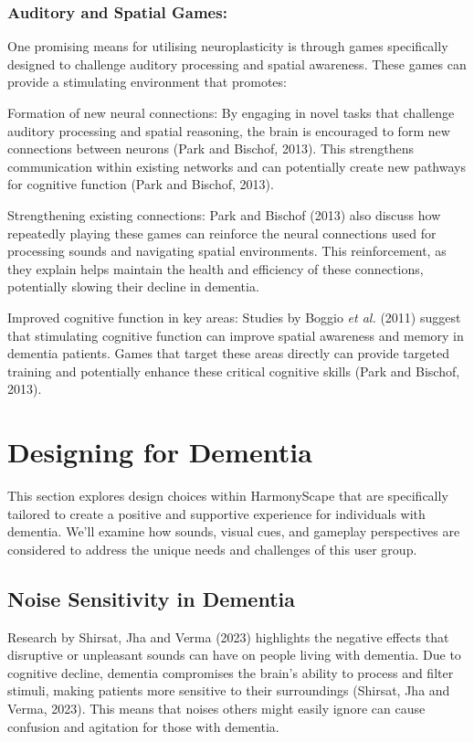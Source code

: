 \documentclass{l4proj}
\begin{document}
\subsubsection{Auditory and Spatial Games:}
One promising means for utilising neuroplasticity is through games specifically designed to challenge auditory processing and spatial awareness. These games can provide a stimulating environment that promotes:

Formation of new neural connections: By engaging in novel tasks that challenge auditory processing and spatial reasoning, the brain is encouraged to form new connections between neurons (Park and Bischof, 2013). This strengthens communication within existing networks and can potentially create new pathways for cognitive function (Park and Bischof, 2013).

Strengthening existing connections: Park and Bischof (2013) also discuss how repeatedly playing these games can reinforce the neural connections used for processing sounds and navigating spatial environments. This reinforcement, as they explain helps maintain the health and efficiency of these connections, potentially slowing their decline in dementia.

Improved cognitive function in key areas: Studies by Boggio \emph{et al.} (2011) suggest that stimulating cognitive function can improve spatial awareness and memory in dementia patients. Games that target these areas directly can provide targeted training and potentially enhance these critical cognitive skills (Park and Bischof, 2013).

\section{Designing for Dementia}
This section explores design choices within HarmonyScape that are specifically tailored to create a positive and supportive experience for individuals with dementia. We'll examine how sounds, visual cues, and gameplay perspectives are considered to address the unique needs and challenges of this user group.

\subsection{Noise Sensitivity in Dementia}\label{sec:noise_sensitivity}
Research by Shirsat, Jha and Verma (2023) highlights the negative effects that disruptive or unpleasant sounds can have on people living with dementia. Due to cognitive decline, dementia compromises the brain's ability to process and filter stimuli, making patients more sensitive to their surroundings (Shirsat, Jha and Verma, 2023). This means that noises others might easily ignore can cause confusion and agitation for those with dementia.
\end{document}
